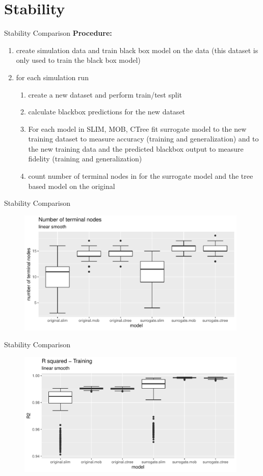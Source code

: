 \documentclass[9pt, xcolor=table]{beamer}
\begin{document}
\section{Stability}
\begin{frame}{Stability Comparison}
\textbf{Procedure:} 
\begin{enumerate}
    \item create simulation data and train black box model on the data (this dataset is only used to train the black box model)
    \item for each simulation run 
    \begin{enumerate}
        \item create a new dataset and perform train/test split
        \item calculate blackbox predictions for the new dataset
        \item For each model in SLIM, MOB, CTree fit surrogate model to the new training dataset to measure accuracy (training and generalization) and to the new training data and the predicted blackbox output to measure fidelity (training and generalization)
        \item count number of terminal nodes in for the surrogate model and the tree based model on the original 
    \end{enumerate}
\end{enumerate}
\end{frame}

\begin{frame}{Stability Comparison}
\begin{figure}
    \includegraphics[width=11cm]{Figures/Stability/linear_smooth/nofnodes.pdf}
\end{figure}
\end{frame}


\begin{frame}{Stability Comparison}
\begin{figure}
    \includegraphics[width=11cm]{Figures/Stability/linear_smooth/r2_train.pdf}
\end{figure}
\end{frame}
\end{document}
